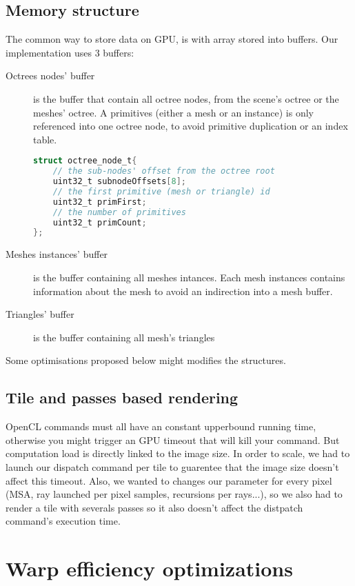 \documentclass[11pt,twocolumn,a4paper]{article}
\begin{document}
\subsection{Memory structure}
The common way to store data on GPU, is with array stored into buffers.
Our implementation uses 3 buffers:
\begin{description}
    \item[Octrees nodes' buffer] is the buffer that contain all octree nodes,
        from the scene's octree or the meshes' octree. A primitives (either a
        mesh or an instance) is only referenced into one octree node, to avoid
        primitive duplication or an index table.
        \begin{lstlisting}[frame=single,language=C,breaklines=true,basicstyle=\tiny]
struct octree_node_t{
    // the sub-nodes' offset from the octree root
    uint32_t subnodeOffsets[8];
    // the first primitive (mesh or triangle) id
    uint32_t primFirst;
    // the number of primitives
    uint32_t primCount;
};
        \end{lstlisting}
    \item[Meshes instances' buffer] is the buffer containing all meshes intances.
        Each mesh instances contains information about the mesh to avoid an
        indirection into a mesh buffer.
    \item[Triangles' buffer] is the buffer containing all mesh's triangles
\end{description}
Some optimisations proposed below might modifies the structures.

\subsection{Tile and passes based rendering}
OpenCL commands must all have an constant upperbound running time, otherwise
you might trigger an GPU timeout that will kill your command. But computation
load is directly linked to the image size. In order to scale, we had to launch
our dispatch command per tile to guarentee that the image size doesn't affect
this timeout. Also, we wanted to changes our parameter for every pixel (MSA,
ray launched per pixel samples, recursions per rays...), so we also had to
render a tile with severals passes so it also doesn't affect the distpatch
command's execution time.

\section{Warp efficiency optimizations}
\end{document}
